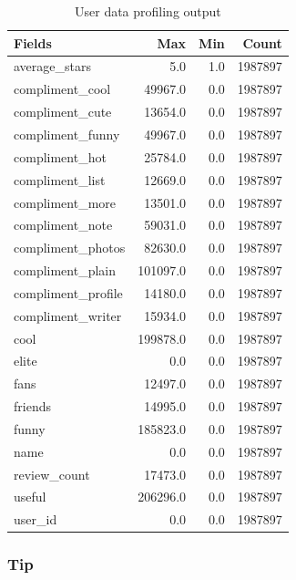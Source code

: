 \documentclass{stylefiles/capstone}
\begin{document}
\begin{table}[h!]
\centering
\begin{tabular}{l r r r} 
 \hline
 Fields & Max & Min & Count \\ [0.5ex] 
 \hline
average\_stars    &      5.0    &    1.0  &  1987897 \\
compliment\_cool  &  49967.0    &    0.0   & 1987897\\
compliment\_cute  &  13654.0     &   0.0   & 1987897\\
compliment\_funny    &       49967.0     &   0.0  &  1987897\\
compliment\_hot   &  25784.0   &     0.0  &  1987897\\
compliment\_list  &  12669.0   &     0.0  &  1987897\\
compliment\_more  &  13501.0   &     0.0  &  1987897\\
compliment\_note  &  59031.0  &      0.0  &  1987897\\
compliment\_photos      &    82630.0   &     0.0  &  1987897\\
compliment\_plain      &    101097.0  &      0.0   & 1987897\\
compliment\_profile      &   14180.0     &   0.0   & 1987897\\
compliment\_writer      &    15934.0    &    0.0  &  1987897\\
cool   &   199878.0    &    0.0  &  1987897\\
elite    &      0.0    &    0.0  & 1987897\\
fans    &   12497.0     &   0.0  &  1987897\\
friends  &  14995.0    &    0.0  &  1987897\\
funny   &  185823.0    &    0.0  &  1987897\\
name   &        0.0     &   0.0  &  1987897\\
review\_count    &   17473.0     &   0.0   & 1987897\\
useful  &  206296.0     &   0.0   & 1987897\\
user\_id    &    0.0     &   0.0   & 1987897\\
 [1ex] 
 \hline
\end{tabular}
\caption{User data profiling output}
\label{user_profile_table}
\end{table}

\subsubsection{\textbf{Tip}}
\end{document}
